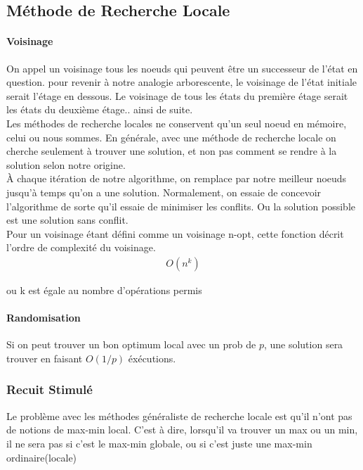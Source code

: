 \documentclass[oneside]{book}
\begin{document}
\subsection{Méthode de Recherche Locale}
\paragraph{Voisinage}
On appel un voisinage tous les noeuds qui peuvent être un successeur de l'état en question. pour revenir à notre analogie arborescente, le voisinage de l'état initiale serait l'étage en dessous. Le voisinage de tous les états du première étage serait les états du deuxième étage.. ainsi de suite.\\

Les méthodes de recherche locales ne conservent qu'un seul noeud en mémoire, celui ou nous sommes. En générale, avec une méthode de recherche locale on cherche seulement à trouver une solution, et non pas comment se rendre à la solution selon notre origine.\\

À chaque itération de notre algorithme, on remplace par notre meilleur noeuds jusqu'à temps qu'on a une solution. Normalement, on essaie de concevoir l'algorithme de sorte qu'il essaie de minimiser les conflits. Ou la solution possible est une solution sans conflit. \\

\noindent
Pour un voisinage étant défini comme un voisinage n-opt, cette fonction décrit l'ordre de complexité du voisinage.
\begin{align*}
O(n^k)
\end{align*}
\begin{center}
ou k est égale au nombre d'opérations permis
\end{center}

\paragraph{Randomisation} Si on peut trouver un bon optimum local avec un prob de $p$, une solution sera trouver en faisant $O(1/p)$ éxécutions.

\subsubsection{Recuit Stimulé} Le problème avec les méthodes généraliste de recherche locale est qu'il n'ont pas de notions de max-min local. C'est à dire, lorsqu'il va trouver un max ou un min, il ne sera pas si c'est le max-min globale, ou si c'est juste une max-min ordinaire(locale) 
\end{document}
